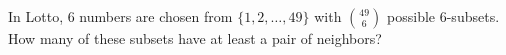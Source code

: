 In Lotto, $6$ numbers are chosen from $\{1, 2, \ldots, 49\}$ with $\binom{49}{6}$ possible $6$-subsets. How many of these subsets have at least a pair of neighbors?
